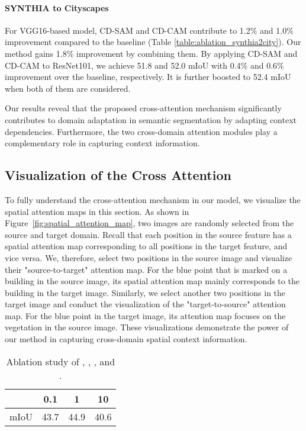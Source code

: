 \documentclass[10pt,twocolumn,letterpaper]{article}
\begin{document}
	\paragraph{SYNTHIA to Cityscapes}

	For VGG16-based model, CD-SAM and CD-CAM contribute to 1.2\% and 1.0\% improvement compared to the baseline (Table \ref{table:ablation_synthia2city}). Our method gains 1.8\% improvement by combining them. By applying CD-SAM and CD-CAM to ResNet101, we achieve 51.8 and 52.0 mIoU with 0.4\% and 0.6\% improvement over the baseline, respectively. It is further boosted to 52.4 mIoU when both of them are considered.

	Our results reveal that the proposed cross-attention mechanism significantly contributes to domain adaptation in semantic segmentation by adapting context dependencies. Furthermore, the two cross-domain attention modules play a complementary role in capturing context information.

	\subsection{Visualization of the Cross Attention}

	To fully understand the cross-attention mechanism in our model, we visualize the spatial attention maps in this section. As shown in Figure~\ref{fig:spatial_attention_map}, two images are randomly selected from the source and target domain. Recall that each position in the source feature has a spatial attention map corresponding to all positions in the target feature, and vice versa. We, therefore, select two positions in the source image and visualize their "source-to-target" attention map. For the blue point that is marked on a building in the source image, its spatial attention map mainly corresponds to the building in the target image. Similarly, we select another two positions in the target image and conduct the visualization of the "target-to-source" attention map. For the blue point in the target image, its attention map focuses on the vegetation in the source image. These visualizations demonstrate the power of our method in capturing cross-domain spatial context information.

	\begin{table}
		\caption{Ablation study of , , , and .}
		\label{table:ablation_attention}

		\footnotesize
		\setlength\tabcolsep{17pt}
		\begin{center}
			\begin{tabularx}{.45\textwidth}{ cccc @{} }
				\toprule
 & 0.1 & 1 & 10 \\
				\midrule
				mIoU & 43.7 & 44.9 & 40.6 \\
				\bottomrule
			\end{tabularx}
		\end{center}
		\vspace{-0.2in}
	\end{table}
\end{document}
